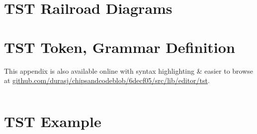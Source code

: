\inputminted[breaklines=true,fontsize=\footnotesize]{text}{./assets/Xor.hdl}

\chapter{TST Railroad Diagrams}
\label{appendix:tst-railroad}

\noindent


\vspace{20pt}

\noindent


\vspace{20pt}

\noindent


\vspace{20pt}

\noindent


\vspace{20pt}

\noindent


\vspace{20pt}

\noindent


\vspace{20pt}

\noindent


\vspace{20pt}

\noindent


\chapter{TST Token, Grammar Definition}
\label{appendix:tst-grammar}

This appendix is also available online with syntax highlighting \& easier to browse at \href{https://github.com/durasj/chipsandcode/blob/6decf05115ba1d4ca927de42f63c8431b1ac3124/src/lib/editor/tst/grammar.ne}{github.com/durasj/chipsandcodeblob/6decf05/src/lib/editor/tst}.

\inputminted[breaklines=true,fontsize=\footnotesize]{text}{./assets/tst.ne}

\chapter{TST Example}
\label{appendix:tst-example}

